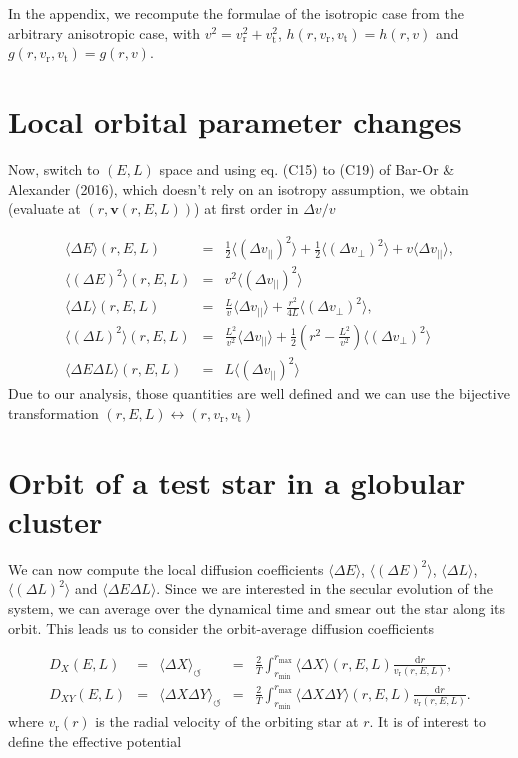 \documentclass[11pt]{article}
\newcommand{\rt}{\mathrm{t}}
\newcommand{\rr}{\mathrm{r}}
\newcommand{\vr}{v_{\rr}}
\newcommand{\vt}{v_{\rt}}
\newcommand{\bv}{\boldsymbol{v}}
\newcommand{\dvPar}{\Delta v_{||}}
\newcommand{\dvPerp}{\Delta v_{\perp}}
\newcommand{\dvParAvrLoc}{\langle \dvPar \rangle}
\newcommand{\dvParSqAvrLoc}{\langle(\dvPar)^{2}\rangle}
\newcommand{\dvPerpSqAvrLoc}{\langle(\dvPerp)^{2}\rangle}
\newcommand{\rd}{{\mathrm{d}}}
\newcommand{\Dv}{\Delta v}
\newcommand{\DE}{\Delta E}
\newcommand{\DL}{\Delta L}
\newcommand{\DEAvr}{\langle\DE\rangle}
\newcommand{\DESqAvr}{\langle (\DE)^{2} \rangle}
\newcommand{\DLAvr}{\langle\DL\rangle}
\newcommand{\DLSqAvr}{\langle (\DL)^{2} \rangle}
\newcommand{\DEDLAvr}{\langle \DE \DL \rangle}
\newcommand{\DXAvr}{\langle\Delta X\rangle}
\newcommand{\DXYAvr}{\langle\Delta X \Delta Y\rangle}
\newcommand{\dX}{D_{X}}
\newcommand{\dXY}{D_{XY}}
\newcommand{\rmax}{r_{\max}}
\newcommand{\rmin}{r_{\min}}
\begin{document}
In the appendix, we recompute the formulae of the isotropic case from
the arbitrary anisotropic case, with $v^{2}=\vr^{2}+\vt^{2}$,
$h(r,\vr,\vt)=h(r,v)$ and $g(r,\vr,\vt)=g(r,v)$.

\section{Local orbital parameter changes}
\label{sec:Local_dE_dL}

Now, switch to $(E,L)$ space and using eq. (C15) to (C19) of Bar-Or
\& Alexander (2016), which doesn't rely on an isotropy assumption,
we obtain (evaluate at $(r,\bv(r,E,L))$) at first order
in $\Dv/v$

\begin{equation}
\begin{array}{ccl}
 \DEAvr(r,E,L) & =&\displaystyle{\frac{1}{2}\dvParSqAvrLoc+\frac{1}{2}\dvPerpSqAvrLoc+v\dvParAvrLoc} ,\\
  
 \DESqAvr(r,E,L) & = &\displaystyle{v^{2}\dvParSqAvrLoc}\\
  \DLAvr(r,E,L) & =&\displaystyle{\frac{L}{v}\dvParAvrLoc+\frac{r^{2}}{4L}\dvPerpSqAvrLoc} ,\\
  
  \DLSqAvr(r,E,L) & = &\displaystyle{\frac{L^{2}}{v^{2}}\dvParAvrLoc+\frac{1}{2}\left(r^{2}-\frac{L^{2}}{v^{2}}\right)\dvPerpSqAvrLoc}\\
  
  \DEDLAvr(r,E,L) & = &\displaystyle{L \dvParSqAvrLoc}   
\end{array}
\label{eq:DE_DL}
\end{equation}
Due to our analysis, those quantities are well defined and
we can use the bijective transformation $(r,E,L)\leftrightarrow(r,\vr,\vt)$

\section{Orbit of a test star in a globular cluster}
\label{sec:Orbit_globular_cluster}

We can now compute the local diffusion coefficients $\DEAvr$,
$\DESqAvr$, $\DLAvr$,
$\DLSqAvr$ and $\DEDLAvr$.
Since we are interested in the secular evolution of the system, we
can average over the dynamical time and smear out the star along its
orbit. This leads us to consider the orbit-average diffusion coefficients

\begin{equation}
\begin{array}{cclcl}
 \dX(E,L) & =& \DXAvr_{\leftturn} & =&\displaystyle{\frac{2}{T}\int_{\rmin}^{\rmax}\DXAvr(r,E,L)\frac{{\rd}r}{\vr(r,E,L)}} ,\\
  
  \dXY(E,L) & =& \DXYAvr_{\leftturn} & =&\displaystyle{\frac{2}{T}\int_{\rmin}^{\rmax}\DXYAvr(r,E,L)\frac{{\rd}r}{\vr(r,E,L)}} .
\end{array}
\label{eq:DE_DL}
\end{equation}
where $\vr(r)$ is the radial velocity of the orbiting star at $r$. It is of interest to define the effective potential
\end{document}

